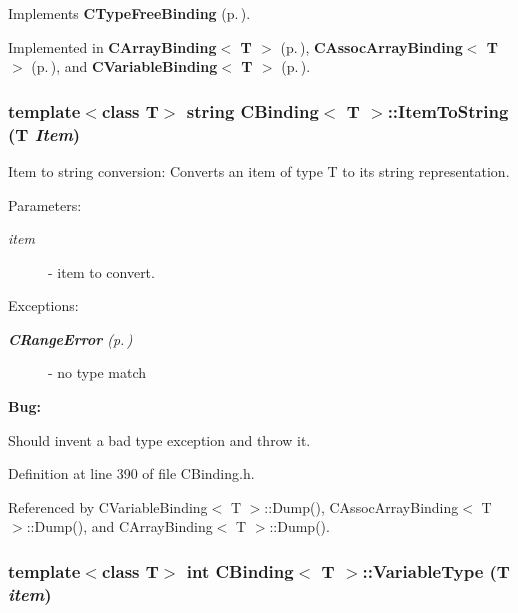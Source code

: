 Implements {\bf CType\-Free\-Binding} {\rm (p.\,\pageref{classCTypeFreeBinding_a0})}.

Implemented in {\bf CArray\-Binding$<$ T $>$} {\rm (p.\,\pageref{classCArrayBinding_a10})}, {\bf CAssoc\-Array\-Binding$<$ T $>$} {\rm (p.\,\pageref{classCAssocArrayBinding_a12})}, and {\bf CVariable\-Binding$<$ T $>$} {\rm (p.\,\pageref{classCVariableBinding_a13})}.
\subsubsection{\setlength{\rightskip}{0pt plus 5cm}template$<$class T$>$ string CBinding$<$ T $>$::Item\-To\-String (T {\em Item})\hspace{0.3cm}{\tt  [inline]}}\label{classCBinding_a4}


Item to string conversion: Converts an item of type T to  its string representation.  \begin{Desc}
\item[Parameters: ]\par
\begin{description}
\item[{\em 
item}]- item to convert. \end{description}
\end{Desc}
\begin{Desc}
\item[Exceptions: ]\par
\begin{description}
\item[{\em 
{\bf CRange\-Error} {\rm (p.\,\pageref{classCRangeError})}}] - no type match \end{description}
\end{Desc}
\begin{Desc}
\item[{\bf Bug: }]\par
 Should invent a bad type exception and throw it. \end{Desc}
 

Definition at line 390 of file CBinding.h.

Referenced by CVariable\-Binding$<$ T $>$::Dump(), CAssoc\-Array\-Binding$<$ T $>$::Dump(), and CArray\-Binding$<$ T $>$::Dump().
\subsubsection{\setlength{\rightskip}{0pt plus 5cm}template$<$class T$>$ int CBinding$<$ T $>$::Variable\-Type (T {\em item})\hspace{0.3cm}{\tt  [inline]}}\label{classCBinding_a3}


